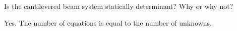 Is the cantilevered beam system statically determinant? Why or why not?

\begin{solution}
    Yes. The number of equations is equal to the number of unknowns.
\end{solution}